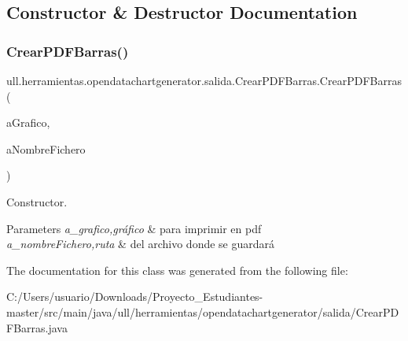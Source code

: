 \subsection{Constructor \& Destructor Documentation}
\mbox{\label{classull_1_1herramientas_1_1opendatachartgenerator_1_1salida_1_1_crear_p_d_f_barras_a141f2e6753a1cdd0d83f9e87b84676ae}} 
\subsubsection{\texorpdfstring{Crear\+P\+D\+F\+Barras()}{CrearPDFBarras()}}
{\footnotesize\ttfamily ull.\+herramientas.\+opendatachartgenerator.\+salida.\+Crear\+P\+D\+F\+Barras.\+Crear\+P\+D\+F\+Barras (\begin{DoxyParamCaption}\item[{J\+Free\+Chart}]{a\+Grafico,  }\item[{String}]{a\+Nombre\+Fichero }\end{DoxyParamCaption})}



Constructor. 


\begin{DoxyParams}{Parameters}
{\em a\+\_\+grafico,gráfico} & para imprimir en pdf \\
\hline
{\em a\+\_\+nombre\+Fichero,ruta} & del archivo donde se guardará \\
\hline
\end{DoxyParams}


The documentation for this class was generated from the following file\+:\begin{DoxyCompactItemize}
\item 
C\+:/\+Users/usuario/\+Downloads/\+Proyecto\+\_\+\+Estudiantes-\/master/src/main/java/ull/herramientas/opendatachartgenerator/salida/Crear\+P\+D\+F\+Barras.\+java\end{DoxyCompactItemize}
